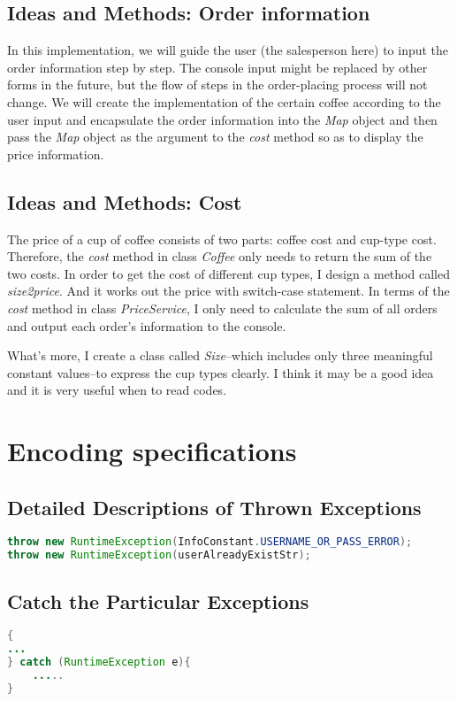 \documentclass[./report.tex]{subfiles}
\begin{document}
\subsection{Ideas and Methods: Order information}
In this implementation, we will guide the user (the salesperson here) to input the order information step by step.  The console input might be replaced by other forms in the future, but the flow of steps in the order-placing process will not change. We will create the implementation of the certain coffee according to the user input and encapsulate the order information into the \emph{Map} object and then pass the \emph{Map} object as the argument to the \emph{cost} method so as to display the price information.

\subsection{Ideas and Methods: Cost}
\par The price of a cup of coffee consists of two parts: coffee cost and cup-type cost. Therefore, the \emph{cost} method in class \emph{Coffee} only needs to return the sum of the two costs. In order to get the cost of different cup types, I design a method called \emph{size2price}. And it works out the price with switch-case statement. In terms of the \emph{cost} method in class \emph{PriceService}, I only need to calculate the sum of all orders and output each order's information to the console.
\par What's more, I create a class called \emph{Size}--which includes only three meaningful constant values--to express the cup types clearly. I think it may be a good idea and it is very useful when to read codes.
 \section{Encoding specifications}
  \subsection{Detailed Descriptions of Thrown Exceptions }
\begin{lstlisting}[language=java]
throw new RuntimeException(InfoConstant.USERNAME_OR_PASS_ERROR);
throw new RuntimeException(userAlreadyExistStr);
\end{lstlisting}

  \subsection{Catch the Particular Exceptions }
  \begin{lstlisting}[language=java]
{
...
} catch (RuntimeException e){
	.....
}
\end{lstlisting}
  
\end{document}
